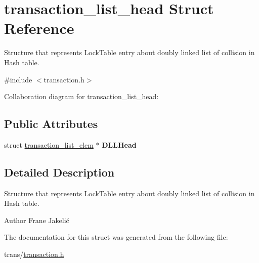 \hypertarget{structtransaction__list__head}{\section{transaction\+\_\+list\+\_\+head Struct Reference}
\label{structtransaction__list__head}
}


Structure that represents Lock\+Table entry about doubly linked list of collision in Hash table.  




{\ttfamily \#include $<$transaction.\+h$>$}



Collaboration diagram for transaction\+\_\+list\+\_\+head\+:
\subsection*{Public Attributes}
\begin{DoxyCompactItemize}
\item 
\hypertarget{structtransaction__list__head_aa77cdca14266fe533d9ca82bb3d3e8ac}{struct \hyperlink{structtransaction__list__elem}{transaction\+\_\+list\+\_\+elem} $\ast$ {\bfseries D\+L\+L\+Head}}\label{structtransaction__list__head_aa77cdca14266fe533d9ca82bb3d3e8ac}

\end{DoxyCompactItemize}


\subsection{Detailed Description}
Structure that represents Lock\+Table entry about doubly linked list of collision in Hash table. 

\begin{DoxyAuthor}{Author}
Frane Jakelić 
\end{DoxyAuthor}


The documentation for this struct was generated from the following file\+:\begin{DoxyCompactItemize}
\item 
trans/\hyperlink{transaction_8h}{transaction.\+h}\end{DoxyCompactItemize}

